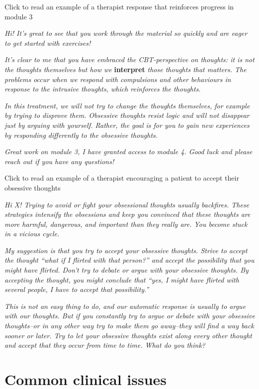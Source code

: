 \documentclass[]{book}
\begin{document}
 Click to read an example of a therapist response that reinforces progress in module 3

\emph{Hi! It's great to see that you work through the material so quickly and are eager to get started with exercises!}

\emph{It's clear to me that you have embraced the CBT-perspective on thoughts: it is not the thoughts themselves but how we} \textbf{interpret} \emph{those thoughts that matters. The problems occur when we respond with compulsions and other behaviours in response to the intrusive thoughts, which reinforces the thoughts.}

\emph{In this treatment, we will not try to change the thoughts themselves, for example by trying to disprove them. Obsessive thoughts resist logic and will not disappear just by arguing with yourself. Rather, the goal is for you to gain new experiences by responding differently to the obsessive thoughts.}

\emph{Great work on module 3, I have granted access to module 4. Good luck and please reach out if you have any questions!}

 Click to read an example of a therapist encouraging a patient to accept their obsessive thoughts

\emph{Hi X! Trying to avoid or fight your obsessional thoughts usually backfires. These strategies intensify the obsessions and keep you convinced that these thoughts are more harmful, dangerous, and important than they really are. You become stuck in a vicious cycle.}

\emph{My suggestion is that you try to accept your obsessive thoughts. Strive to accept the thought ``what if I flirted with that person?'' and accept the possibility that you might have flirted. Don't try to debate or argue with your obsessive thoughts. By accepting the thought, you might conclude that ``yes, I might have flirted with several people, I have to accept that possibility.''}

\emph{This is not an easy thing to do, and our automatic response is usually to argue with our thoughts. But if you constantly try to argue or debate with your obsessive thoughts--or in any other way try to make them go away--they will find a way back sooner or later. Try to let your obsessive thoughts exist along every other thought and accept that they occur from time to time. What do you think?}

\hypertarget{common-clinical-issues}{%
\section{Common clinical issues}\label{common-clinical-issues}}
\end{document}
